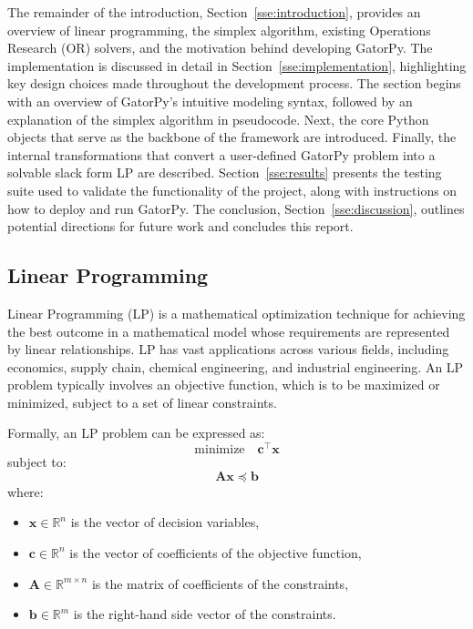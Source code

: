 \documentclass[conference]{IEEEtran}
\begin{document}
The remainder of the introduction, Section~\ref{sse:introduction}, provides an overview of linear programming, the simplex algorithm, existing Operations Research (OR) solvers, and the motivation behind developing GatorPy. 
The implementation is discussed in detail in Section~\ref{sse:implementation}, highlighting key design choices made throughout the development process. 
The section begins with an overview of GatorPy's intuitive modeling syntax, followed by an explanation of the simplex algorithm in pseudocode. 
Next, the core Python objects that serve as the backbone of the framework are introduced. 
Finally, the internal transformations that convert a user-defined GatorPy problem into a solvable slack form LP are described.
Section~\ref{sse:results} presents the testing suite used to validate the functionality of the project, along with instructions on how to deploy and run GatorPy.
The conclusion, Section~\ref{sse:discussion}, outlines potential directions for future work and concludes this report.

\subsection{Linear Programming}

Linear Programming (LP) is a mathematical optimization technique for achieving the best outcome in a mathematical model whose requirements are represented by linear relationships. 
LP has vast applications across various fields, including economics, supply chain, chemical engineering, and industrial engineering. 
An LP problem typically involves an objective function, which is to be maximized or minimized, subject to a set of linear constraints.

Formally, an LP problem can be expressed as:
\[
\text{minimize} \quad \mathbf{c}^\top \mathbf{x}
\]
subject to:
\[
\mathbf{A} \mathbf{x} \preceq \mathbf{b}
\]
where:
\begin{itemize}
    \item \(\mathbf{x} \in \mathbb{R}^n\) is the vector of decision variables,
    \item \(\mathbf{c} \in \mathbb{R}^n\) is the vector of coefficients of the objective function,
    \item \(\mathbf{A} \in \mathbb{R}^{m \times n}\) is the matrix of coefficients of the constraints,
    \item \(\mathbf{b} \in \mathbb{R}^m\) is the right-hand side vector of the constraints.
\end{itemize}
\end{document}
